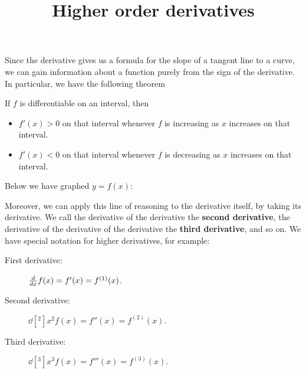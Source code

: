 \documentclass{ximera}
\title[Dig-In:]{Higher order derivatives}
\begin{document}
\begin{abstract}
  
\end{abstract}
\maketitle


Since the derivative gives us a formula for the slope of a tangent
line to a curve, we can gain information about a function purely from
the sign of the derivative.  In particular, we have the following theorem
\begin{theorem}
  If $f$ is differentiable on an interval, then
\begin{itemize}
\item $f'(x)>0$ on that interval whenever $f$ is increasing as $x$
  increases on that interval.
\item $f'(x)<0$ on that interval whenever $f$ is decreasing as $x$
  increases on that interval.
\end{itemize}
\end{theorem}
\begin{question}
  Below we have graphed $y=f(x)$:
  \begin{image}
  \end{image}
\end{question}
Moreover, we can apply this line of reasoning to the derivative
itself, by taking its derivative. We call the derivative of the
derivative the \textbf{second derivative}, the derivative of the
derivative of the derivative the \textbf{third derivative}, and so
on. We have special notation for higher derivatives, for example:
\begin{description}
\item[First derivative:] $\frac{d}{dx} f(x) = f'(x) = f^{(1)}(x)$.
\item[Second derivative:] $\dd[^2]{x^2} f(x) = f''(x) = f^{(2)}(x)$.
\item[Third derivative:] $\dd[^3]{x^3} f(x) = f'''(x) = f^{(3)}(x)$.
\end{description}
\end{document}
